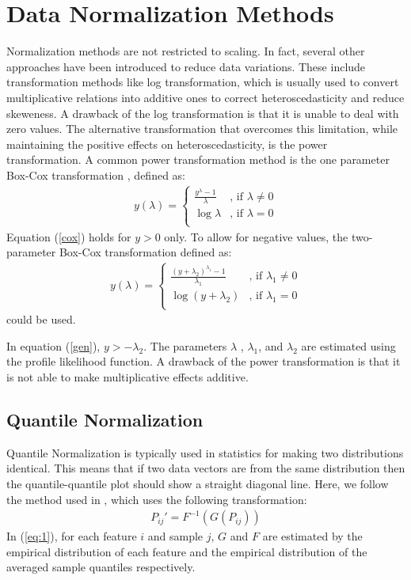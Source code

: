 \section{Data Normalization Methods }
Normalization methods are not restricted to scaling. In fact, several other approaches have been introduced to reduce data variations. These include transformation methods like log transformation, which is usually used to convert multiplicative relations into additive ones to correct heteroscedasticity \cite{keller} and reduce skeweness. A drawback of the log transformation is that it is unable to deal with zero values.  The alternative transformation that overcomes this limitation, while maintaining the positive effects on heteroscedasticity, is the power transformation. A common power transformation method is the one parameter Box-Cox transformation \cite{boxcox}, defined as:
\begin{eqnarray}\label{cox}
y(\lambda)= \left\{
\begin{array}{ll}
\frac{y^{\lambda} -1}{\lambda} & \mbox{, if } \lambda \neq 0 \\
\log \lambda & \mbox{, if }  \lambda = 0 \\
\end{array}
\right.
\end{eqnarray}
Equation (\ref{cox}) holds for $y > 0 $ only. To allow for negative values, the two- parameter Box-Cox transformation defined as:
\begin{eqnarray}\label{gen}
y(\lambda)= \left\{
\begin{array}{ll}
\frac{(y+ \lambda_2)^{\lambda_1} -1}{\lambda_1} & \mbox{, if } \lambda_1 \neq 0 \\
\log (y+\lambda_2) & \mbox{, if }  \lambda_1 = 0 \\
\end{array}
\right.
\end{eqnarray}
could be used. 

In equation (\ref{gen}), $y > -\lambda_2$. The parameters $ \lambda $ , $ \lambda_1$, and $ \lambda_2$ are estimated using the profile likelihood function. A drawback of the power transformation is that it is not able to make multiplicative effects additive.

\subsection{ Quantile Normalization}
Quantile Normalization is typically used in statistics for making two distributions identical. This means that if two data vectors are from the same distribution then the quantile-quantile plot should show a straight diagonal line. Here, we follow the method used in \cite{bolstad:eke:2}, which uses the following transformation: \\
\begin{eqnarray}\label{eq:1}
P_{ij}'= F^{-1}(G(P_{ij}))
\end{eqnarray}
In (\ref{eq:1}), for each feature $i$ and sample $j$, $G$ and $F$ are estimated by the empirical distribution of each feature and the empirical distribution of the averaged sample quantiles respectively.


